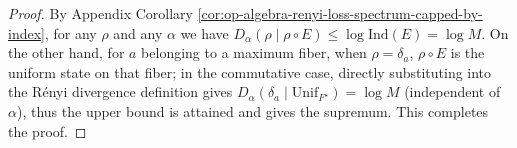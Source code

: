 \begin{proof}
By Appendix Corollary \ref{cor:op-algebra-renyi-loss-spectrum-capped-by-index}, for any \(\rho\) and any \(\alpha\) we have
\(
D_\alpha(\rho\mid\rho\circ E)\le \log\mathrm{Ind}(E)=\log M
\).
On the other hand, for \(a\) belonging to a maximum fiber, when \(\rho=\delta_a\), \(\rho\circ E\) is the uniform state on that fiber;
in the commutative case, directly substituting into the Rényi divergence definition gives
\(
D_\alpha(\delta_a\mid \mathrm{Unif}_{F^\star})=\log M
\)
(independent of \(\alpha\)), thus the upper bound is attained and gives the supremum. This completes the proof.
\end{proof}

\endinput

